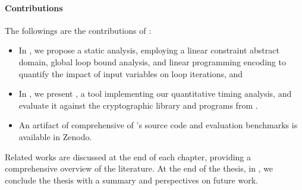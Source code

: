 \paragraph{Contributions}

The followings are the contributions of :

\begin{itemize}
  \item In , we propose a static analysis, employing a linear constraint abstract domain, global loop bound analysis, and linear programming encoding to quantify the impact of input variables on loop iterations, and
  \item In , we present \timesec\sidenote{\timesecurl}, a tool implementing our quantitative timing analysis, and evaluate it against the \bignum{} cryptographic library\sidenote{\bignumurl} and programs from \svcomp \sidenote{\svcompurl}.
  \item An artifact of \timesec{} comprehensive of \timesec's source code and evaluation benchmarks is available in Zenodo\sidenote{\timeseczenodo}.
\end{itemize}

\frenchdiv

Related works are discussed at the end of each chapter, providing a comprehensive overview of the literature.
At the end of the thesis, in , we conclude the thesis with a summary and perspectives on future work.

